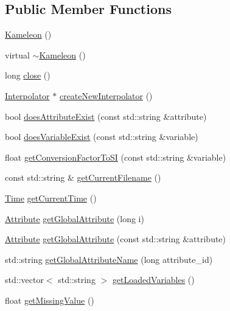 \subsection*{Public Member Functions}
\begin{DoxyCompactItemize}
\item 
\hyperlink{classccmc_1_1_kameleon_a47ad54f81ad7a5e0a3fb99fe9590afa8}{Kameleon} ()
\item 
virtual \hyperlink{classccmc_1_1_kameleon_a79031ab3a45094967b9fed9d4b38517a}{$\sim$\-Kameleon} ()
\item 
long \hyperlink{classccmc_1_1_kameleon_a165e1d86285b532793e62536854ad3d8}{close} ()
\item 
\hyperlink{classccmc_1_1_interpolator}{Interpolator} $\ast$ \hyperlink{classccmc_1_1_kameleon_a59797b1c1c5c224436d8fb25b9c665b4}{create\-New\-Interpolator} ()
\item 
bool \hyperlink{classccmc_1_1_kameleon_abdbeddc69b5755f1f3aa190dc7cd5a01}{does\-Attribute\-Exist} (const std\-::string \&attribute)
\item 
bool \hyperlink{classccmc_1_1_kameleon_a35324f91c44d7ae59fc6b6a6cd22a651}{does\-Variable\-Exist} (const std\-::string \&variable)
\item 
float \hyperlink{classccmc_1_1_kameleon_a4a23c46a5f162497af00997cb8d8dc7d}{get\-Conversion\-Factor\-To\-S\-I} (const std\-::string \&variable)
\item 
const std\-::string \& \hyperlink{classccmc_1_1_kameleon_a8fe34887cd17afb86fd238b1493b27a2}{get\-Current\-Filename} ()
\item 
\hyperlink{classccmc_1_1_time}{Time} \hyperlink{classccmc_1_1_kameleon_aec2617c0095baf398baa3d7b34f1b22d}{get\-Current\-Time} ()
\item 
\hyperlink{classccmc_1_1_attribute}{Attribute} \hyperlink{classccmc_1_1_kameleon_adf890005ebbc3da5330ddaf598cf837d}{get\-Global\-Attribute} (long i)
\item 
\hyperlink{classccmc_1_1_attribute}{Attribute} \hyperlink{classccmc_1_1_kameleon_a89be090186b6019598ea05967625455c}{get\-Global\-Attribute} (const std\-::string \&attribute)
\item 
std\-::string \hyperlink{classccmc_1_1_kameleon_a1261563846a3faf15448d85f5513feab}{get\-Global\-Attribute\-Name} (long attribute\-\_\-id)
\item 
std\-::vector$<$ std\-::string $>$ \hyperlink{classccmc_1_1_kameleon_ab4fd3e9500099ad69de3b54565ee68db}{get\-Loaded\-Variables} ()
\item 
float \hyperlink{classccmc_1_1_kameleon_a951f273a82198c84ba98e30a7a4bace7}{get\-Missing\-Value} ()

\end{DoxyCompactItemize}
